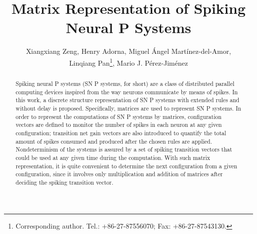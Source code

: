 \documentclass[runningheads]{llncs}
\begin{document}
\title{Matrix Representation of Spiking Neural P Systems}

\author{Xiangxiang Zeng, Henry Adorna, Miguel \'{A}ngel
Mart\'{i}nez-del-Amor,\\
Linqiang Pan\thanks {Corresponding author. Tel.:
+86-27-87556070; Fax: +86-27-87543130.}, Mario J.
P\'{e}rez-Jim\'{e}nez}

\maketitle

\begin{abstract}

Spiking neural P systems (SN P systems, for short) are a class of
distributed parallel computing devices inspired from the way neurons
communicate by means of spikes. In this work, a discrete structure
representation of SN P systems with extended rules and without delay is proposed.
Specifically, matrices
are used to represent SN P systems. In order to represent the
computations of SN P systems by matrices, configuration vectors are
defined to monitor the number of spikes in each neuron at any given
configuration; transition net gain vectors are also introduced to
quantify the total amount of spikes consumed and produced after the
chosen rules are applied. Nondeterminism of the systems is assured
by a set of spiking transition vectors that could be used at any
given time during the computation. With such matrix representation,
it is quite convenient to determine the next configuration from a
given configuration, since it involves only multiplication and
addition of matrices after deciding the spiking transition vector.
\end{abstract}
\end{document}
